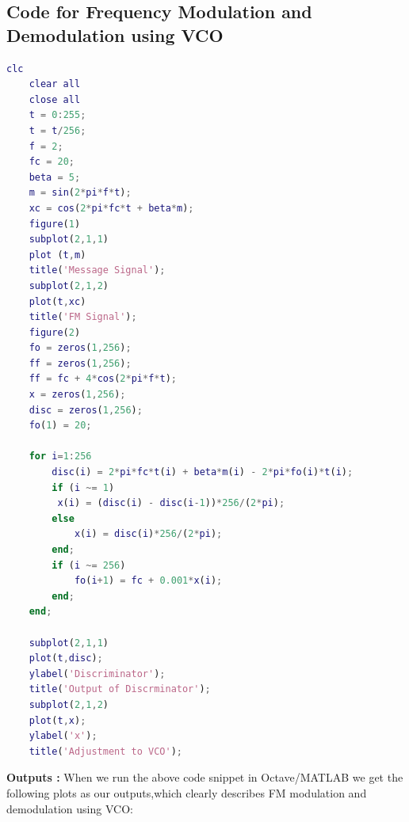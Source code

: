 \documentclass[12pt,a4paper]{article}%
\begin{document}
    \subsection{Code for Frequency Modulation and Demodulation using VCO}
    \lstset{numbers=none,breaklines=true,} 
    \begin{lstlisting}[language=MATLAB]
    clc
    clear all
    close all
    t = 0:255;
    t = t/256;
    f = 2;
    fc = 20;
    beta = 5;
    m = sin(2*pi*f*t);
    xc = cos(2*pi*fc*t + beta*m);
    figure(1)
    subplot(2,1,1)
    plot (t,m)
    title('Message Signal');
    subplot(2,1,2)
    plot(t,xc)
    title('FM Signal');
    figure(2)
    fo = zeros(1,256);
    ff = zeros(1,256);
    ff = fc + 4*cos(2*pi*f*t);
    x = zeros(1,256);
    disc = zeros(1,256);
    fo(1) = 20;
    
    for i=1:256
	    disc(i) = 2*pi*fc*t(i) + beta*m(i) - 2*pi*fo(i)*t(i);
	    if (i ~= 1)
	   	 x(i) = (disc(i) - disc(i-1))*256/(2*pi);
	    else
	    	x(i) = disc(i)*256/(2*pi);
	    end;
	    if (i ~= 256)
	    	fo(i+1) = fc + 0.001*x(i);
	    end;
    end;
    
    subplot(2,1,1)
    plot(t,disc);
    ylabel('Discriminator');
    title('Output of Discrminator');
    subplot(2,1,2)
    plot(t,x);
    ylabel('x');
    title('Adjustment to VCO');
    \end{lstlisting}
    \pagebreak
    \large\textbf{Outputs : }
    \small When we run the above code snippet in Octave/MATLAB we get the following plots as our outputs,which clearly describes FM modulation and demodulation using VCO: \\\bigskip
    \centering
\end{document}

